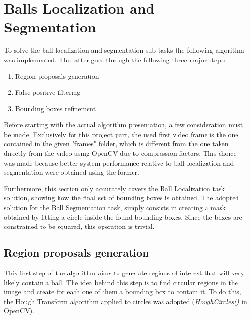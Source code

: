 \section{Balls Localization and Segmentation}

To solve the ball localization and segmentation sub-tasks the following algorithm was implemented.
The latter goes through the following three major steps:
\begin{enumerate}
    \item Region proposals generation
    \item False positive filtering
    \item Bounding boxes refinement
\end{enumerate}

Before starting with the actual algorithm presentation, a few consideration must be made.
Exclusively for this project part, the used first video frame is the one contained in the given "frames" folder, which is different
from the one taken directly from the video using OpenCV due to compression factors. This choice was made because better system performance relative to 
ball localization and segmentation were obtained using the former.

Furthermore, this section only accurately covers the Ball Localization task solution, showing how the final set of bounding boxes is obtained.
The adopted solution for the Ball Segmentation task, simply consists in creating a mask obtained by fitting a circle inside the found bounding boxes.
Since the boxes are constrained to be squared, this operation is trivial.


\subsection{Region proposals generation}
This first step of the algorithm aims to generate regions of interest that will very likely 
contain a ball. The idea behind this step is to find circular regions in the image and create for each one of them
a bounding box to contain it. To do this, the Hough Transform algorithm applied to circles was adopted
(\textit{HoughCircles()} in OpenCV).


